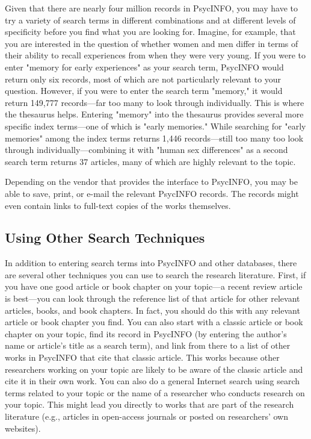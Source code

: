 Given that there are nearly four million records in PsycINFO, you may have to try a variety of search terms in different combinations and at different levels of specificity before you find what you are looking for. Imagine, for example, that you are interested in the question of whether women and men differ in terms of their ability to recall experiences from when they were very young. If you were to enter "memory for early experiences" as your search term, PsycINFO would return only six records, most of which are not particularly relevant to your question. However, if you were to enter the search term "memory," it would return 149,777 records---far too many to look through individually. This is where the thesaurus helps. Entering "memory" into the thesaurus provides several more specific index terms---one of which is "early memories." While searching for "early memories" among the index terms returns 1,446 records---still too many too look through individually---combining it with "human sex differences" as a second search term returns 37 articles, many of which are highly relevant to the topic.

Depending on the vendor that provides the interface to PsycINFO, you may be able to save, print, or e-mail the relevant PsycINFO records. The records might even contain links to full-text copies of the works themselves.

\subsection{Using Other Search Techniques}

In addition to entering search terms into PsycINFO and other databases, there are several other techniques you can use to search the research literature. First, if you have one good article or book chapter on your topic---a recent review article is best---you can look through the reference list of that article for other relevant articles, books, and book chapters. In fact, you should do this with any relevant article or book chapter you find. You can also start with a classic article or book chapter on your topic, find its record in PsycINFO (by entering the author's name or article's title as a search term), and link from there to a list of other works in PsycINFO that cite that classic article. This works because other researchers working on your topic are likely to be aware of the classic article and cite it in their own work. You can also do a general Internet search using search terms related to your topic or the name of a researcher who conducts research on your topic. This might lead you directly to works that are part of the research literature (e.g., articles in open-access journals or posted on researchers' own websites). 

